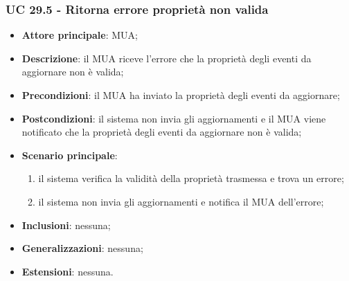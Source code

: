     \subsubsection{UC 29.5 - Ritorna errore proprietà non valida} \label{sec:UC29.5}
    \begin{itemize}
        \item \textbf{Attore principale}: MUA;
        \item \textbf{Descrizione}: il MUA riceve l'errore che la proprietà degli eventi da aggiornare non è valida;
        \item \textbf{Precondizioni}: il MUA ha inviato la proprietà degli eventi da aggiornare;
        \item \textbf{Postcondizioni}: il sistema non invia gli aggiornamenti e il MUA viene notificato che la proprietà degli eventi da aggiornare non è valida;
        \item \textbf{Scenario principale}:
            \begin{enumerate}
                \item il sistema verifica la validità della proprietà trasmessa e trova un errore;
                \item il sistema non invia gli aggiornamenti e notifica il MUA dell'errore;
            \end{enumerate}
        \item \textbf{Inclusioni}: nessuna;
        \item \textbf{Generalizzazioni}: nessuna;
        \item \textbf{Estensioni}: nessuna.
    \end{itemize}
